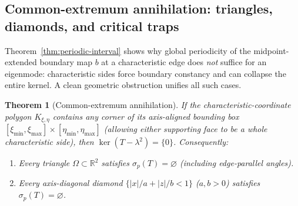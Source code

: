 \documentclass[11pt,reqno]{amsart}
\newtheorem{theorem}{Theorem}[section]
\theoremstyle{definition}
\theoremstyle{remark}
\newcommand{\R}{\mathbb{R}}
\begin{document}
\subsection{Common-extremum annihilation: triangles, diamonds, and critical traps}
Theorem~\ref{thm:periodic-interval} shows why global periodicity of the midpoint-extended boundary map $b$ at a characteristic edge does \emph{not} suffice for an eigenmode: characteristic sides force boundary constancy and can collapse the entire kernel. A clean geometric obstruction unifies all such cases.

\begin{theorem}[Common-extremum annihilation]\label{thm:common-extremum}
If the characteristic-coordinate polygon $K_{\xi,\eta}$ contains any corner of its axis-aligned bounding box $[\xi_{\min},\xi_{\max}] \times [\eta_{\min},\eta_{\max}]$ (allowing either supporting face to be a whole characteristic side), then $\ker(T - \lambda^2) = \{0\}$. Consequently:
\begin{enumerate}
  \item Every triangle $\Omega \subset \R^2$ satisfies $\sigma_p(T) = \varnothing$ (including edge-parallel angles).
  \item Every axis-diagonal diamond $\{|x|/a + |z|/b < 1\}$ ($a, b > 0$) satisfies $\sigma_p(T) = \varnothing$.
\end{enumerate}
\end{theorem}
\end{document}
